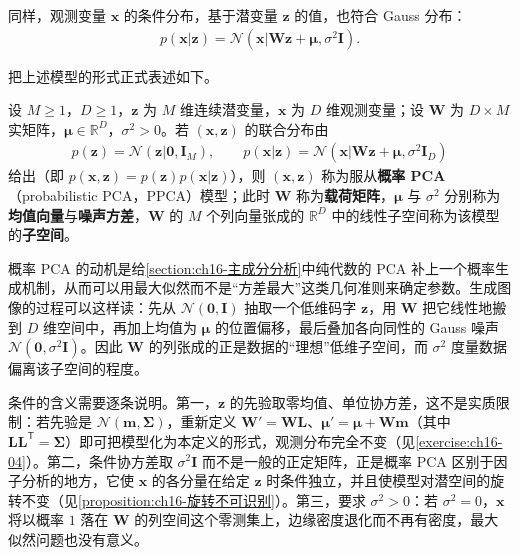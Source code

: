 \documentclass[../../main.tex]{subfiles}
\begin{document}
同样，观测变量 $\bm{x}$ 的条件分布，基于潜变量 $\bm{z}$ 的值，也符合 Gauss 分布：
\begin{align}
  p(\bm{x}|\bm{z})=\mathcal{N}(\bm{x}|\bm{W}\bm{z}+\bm{\mu},\sigma^2\bm{I}).
  \label{align:ch16-条件分布}
\end{align}

把上述模型的形式正式表述如下。

\begin{definition}[概率 PCA]\label{definition:ch16-概率PCA}
设 $M\geqslant1$，$D\geqslant1$，$\bm{z}$ 为 $M$ 维连续潜变量，$\bm{x}$ 为 $D$ 维观测变量；设 $\bm{W}$ 为 $D\times M$ 实矩阵，$\bm{\mu}\in\mathbb{R}^{D}$，$\sigma^2>0$。若 $(\bm{x},\bm{z})$ 的联合分布由
\begin{align*}
  p(\bm{z})=\mathcal{N}(\bm{z}|\bm{0},\bm{I}_M),\qquad
  p(\bm{x}|\bm{z})=\mathcal{N}(\bm{x}|\bm{W}\bm{z}+\bm{\mu},\sigma^2\bm{I}_D)
\end{align*}
给出（即 $p(\bm{x},\bm{z})=p(\bm{z})p(\bm{x}|\bm{z})$），则 $(\bm{x},\bm{z})$ 称为服从\textbf{概率 PCA}（probabilistic PCA，PPCA）模型；此时 $\bm{W}$ 称为\textbf{载荷矩阵}，$\bm{\mu}$ 与 $\sigma^2$ 分别称为\textbf{均值向量}与\textbf{噪声方差}，$\bm{W}$ 的 $M$ 个列向量张成的 $\mathbb{R}^{D}$ 中的线性子空间称为该模型的\textbf{子空间}。
\end{definition}

\begin{remark}
概率 PCA 的动机是给\cref{section:ch16-主成分分析}中纯代数的 PCA 补上一个概率生成机制，从而可以用最大似然而不是“方差最大”这类几何准则来确定参数。生成图像的过程可以这样读：先从 $\mathcal{N}(\bm{0},\bm{I})$ 抽取一个低维码字 $\bm{z}$，用 $\bm{W}$ 把它线性地搬到 $D$ 维空间中，再加上均值为 $\bm{\mu}$ 的位置偏移，最后叠加各向同性的 Gauss 噪声 $\mathcal{N}(\bm{0},\sigma^2\bm{I})$。因此 $\bm{W}$ 的列张成的正是数据的“理想”低维子空间，而 $\sigma^2$ 度量数据偏离该子空间的程度。

条件的含义需要逐条说明。第一，$\bm{z}$ 的先验取零均值、单位协方差，这不是实质限制：若先验是 $\mathcal{N}(\bm{m},\bm{\Sigma})$，重新定义 $\bm{W}'=\bm{W}\bm{L}$、$\bm{\mu}'=\bm{\mu}+\bm{W}\bm{m}$（其中 $\bm{L}\bm{L}^{\mathsf T}=\bm{\Sigma}$）即可把模型化为本定义的形式，观测分布完全不变（见\cref{exercise:ch16-04}）。第二，条件协方差取 $\sigma^2\bm{I}$ 而不是一般的正定矩阵，正是概率 PCA 区别于因子分析的地方，它使 $\bm{x}$ 的各分量在给定 $\bm{z}$ 时条件独立，并且使模型对潜空间的旋转不变（见\cref{proposition:ch16-旋转不可识别}）。第三，要求 $\sigma^2>0$：若 $\sigma^2=0$，$\bm{x}$ 将以概率 $1$ 落在 $\bm{W}$ 的列空间这个零测集上，边缘密度退化而不再有密度，最大似然问题也没有意义。
\end{remark}
\end{document}
